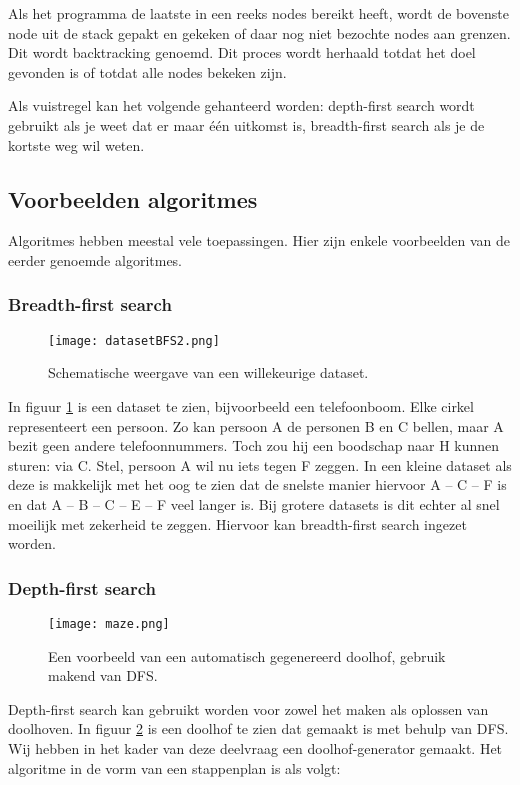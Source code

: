 Als het programma de laatste in een reeks nodes bereikt heeft, wordt de bovenste node uit de stack gepakt en gekeken of daar nog niet bezochte nodes aan grenzen. Dit wordt backtracking genoemd.
Dit proces wordt herhaald totdat het doel gevonden is of totdat alle nodes bekeken zijn.

Als vuistregel kan het volgende gehanteerd worden: depth-first search wordt gebruikt als je weet dat er maar \'e\'en uitkomst is, breadth-first search als je de kortste weg wil weten.



\subsection{Voorbeelden algoritmes}
Algoritmes hebben meestal vele toepassingen. Hier zijn enkele voorbeelden van de eerder genoemde algoritmes.
\subsubsection{Breadth-first search}
\begin{figure}[h]
  \centering
    \texttt{[image: datasetBFS2.png]}
  \caption{Schematische weergave van een willekeurige dataset.}
  \label{fig:datasetBFS2}
\end{figure}

In figuur \ref{fig:datasetBFS2} is een dataset te zien, bijvoorbeeld een telefoonboom. Elke cirkel representeert een persoon. Zo kan persoon A de personen B en C bellen, maar A bezit geen andere telefoonnummers. Toch zou hij een boodschap naar H kunnen sturen: via C. 
Stel, persoon A wil nu iets tegen F zeggen. In een kleine dataset als deze is makkelijk met het oog te zien dat de snelste manier hiervoor A – C – F is en dat A – B – C – E – F veel langer is. Bij grotere datasets is dit echter al snel moeilijk met zekerheid te zeggen. Hiervoor kan breadth-first search ingezet worden.

\subsubsection{Depth-first search}
\begin{figure}[H]
  \centering
    \texttt{[image: maze.png]}
  \caption{Een voorbeeld van een automatisch gegenereerd doolhof, gebruik makend van DFS.}
  \label{fig:maze}
\end{figure}

Depth-first search kan gebruikt worden voor zowel het maken als oplossen van doolhoven. In figuur \ref{fig:maze} is een doolhof te zien dat gemaakt is met behulp van DFS. Wij hebben in het kader van deze deelvraag een doolhof-generator gemaakt. Het algoritme in de vorm van een stappenplan is als volgt:

